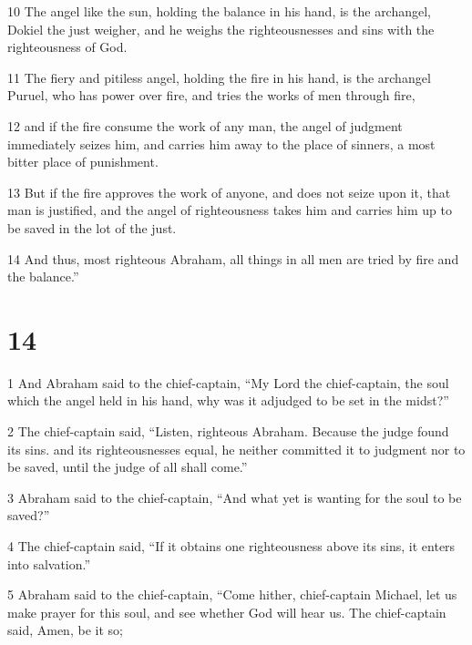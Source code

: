 \par 10 The angel like the sun, holding the balance in his hand, is the archangel, Dokiel the just weigher, and he weighs the righteousnesses and sins with the righteousness of God. 

\par 11 The fiery and pitiless angel, holding the fire in his hand, is the archangel Puruel, who has power over fire, and tries the works of men through fire, 

\par 12 and if the fire consume the work of any man, the angel of judgment immediately seizes him, and carries him away to the place of sinners, a most bitter place of punishment. 

\par 13 But if the fire approves the work of anyone, and does not seize upon it, that man is justified, and the angel of righteousness takes him and carries him up to be saved in the lot of the just. 

\par 14 And thus, most righteous Abraham, all things in all men are tried by fire and the balance.”

\chapter{14}

\par 1 And Abraham said to the chief-captain, “My Lord the chief-captain, the soul which the angel held in his hand, why was it adjudged to be set in the midst?” 

\par 2 The chief-captain said, “Listen, righteous Abraham. Because the judge found its sins. and its righteousnesses equal, he neither committed it to judgment nor to be saved, until the judge of all shall come.” 

\par 3 Abraham said to the chief-captain, “And what yet is wanting for the soul to be saved?” 

\par 4 The chief-captain said, “If it obtains one righteousness above its sins, it enters into salvation.” 

\par 5 Abraham said to the chief-captain, “Come hither, chief-captain Michael, let us make prayer for this soul, and see whether God will hear us. The chief-captain said, Amen, be it so; 

